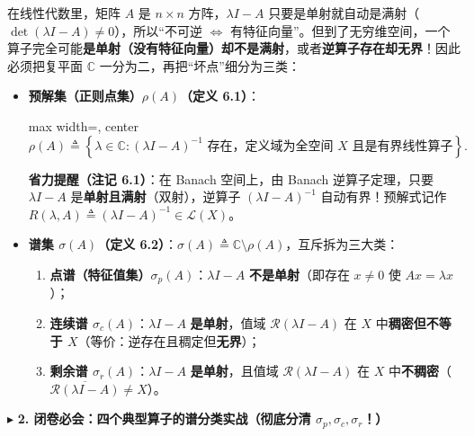 \documentclass[11pt,a4paper]{article}
\providecommand{\tightlist}{\setlength{\itemsep}{2pt}\setlength{\parskip}{0pt}}
\newcommand{\SubSubHeading}[1]{%
  \Needspace{6.5\baselineskip}\vspace{5.5pt}\noindent
  \textcolor{AccentMain}{\scriptsize$\blacktriangleright$}\hspace{4pt}%
  {\small\bfseries\color{AccentMain}#1}\par\nopagebreak[4]\vspace{2.5pt}%
}
\renewenvironment{quote}{%
  \begin{tcolorbox}[
    enhanced,
    breakable,
    colback=AccentSoft!48!white,
    colframe=AccentMain,
    boxrule=0pt,
    leftrule=2.8pt,
    arc=2.5pt,
    left=9pt, right=8pt, top=6pt, bottom=6pt,
    before skip=5.5pt, after skip=5.5pt
  ]\small
}{%
  \end{tcolorbox}%
}
\newcommand{\FitDisplayMath}[1]{%
  \par\vspace{4.5pt}\noindent
  \begin{adjustbox}{max width=\linewidth, center}
    $\displaystyle #1$
  \end{adjustbox}
  \par\vspace{4.5pt}%
}
\begin{document}
在线性代数里，矩阵 \(A\) 是 \(n\times n\) 方阵，\(\lambda I - A\) 只要是单射就自动是满射（\(\det(\lambda I - A) \neq 0\)），所以``不可逆 \(\iff\) 有特征向量''。但到了无穷维空间，一个算子完全可能\textbf{是单射（没有特征向量）却不是满射}，或者\textbf{逆算子存在却无界}！因此必须把复平面 \(\mathbb{C}\) 一分为二，再把``坏点''细分为三类：

\begin{itemize}
\item
  \textbf{预解集（正则点集）\(\rho(A)\)（定义 6.1）}： 
\FitDisplayMath{\rho(A) \triangleq \left\{\lambda \in \mathbb{C} : (\lambda I - A)^{-1} \text{ 存在，定义域为全空间 } X \text{ 且是有界线性算子}\right\}.}


  \begin{quote}
  \textbf{省力提醒（注记 6.1）}：在 Banach 空间上，由 Banach 逆算子定理，只要 \(\lambda I - A\) 是\textbf{单射且满射}（双射），逆算子 \((\lambda I - A)^{-1}\) 自动有界！预解式记作 \(R(\lambda, A) \triangleq (\lambda I - A)^{-1} \in \mathcal{L}(X)\)。
  \end{quote}
\item
  \textbf{谱集 \(\sigma(A)\)（定义 6.2）}：\(\sigma(A) \triangleq \mathbb{C} \setminus \rho(A)\)，互斥拆为三大类：

  \begin{enumerate}
  \def\labelenumi{\arabic{enumi}.}
  \tightlist
  \item
    \textbf{点谱（特征值集）\(\sigma_p(A)\)}：\(\lambda I - A\) \textbf{不是单射}（即存在 \(x \neq 0\) 使 \(Ax = \lambda x\)）；
  \item
    \textbf{连续谱 \(\sigma_c(A)\)}：\(\lambda I - A\) \textbf{是单射}，值域 \(\mathcal{R}(\lambda I - A)\) 在 \(X\) 中\textbf{稠密但不等于 \(X\)}（等价：逆存在且稠定但\textbf{无界}）；
  \item
    \textbf{剩余谱 \(\sigma_r(A)\)}：\(\lambda I - A\) \textbf{是单射}，且值域 \(\mathcal{R}(\lambda I - A)\) 在 \(X\) 中\textbf{不稠密}（\(\overline{\mathcal{R}(\lambda I - A)} \neq X\)）。
  \end{enumerate}
\end{itemize}

\SubSubHeading{2. 闭卷必会：四个典型算子的谱分类实战（彻底分清 \(\sigma_p, \sigma_c, \sigma_r\)！）}
\end{document}
